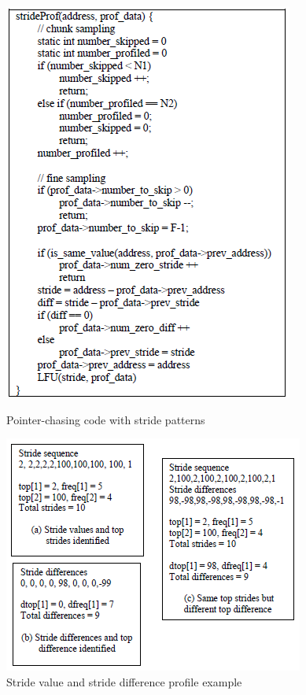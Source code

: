 \documentclass[11pt]{article}
\begin{document}
  \begin{figure}[h]
    \centering
    \begin{minipage} [b] {7.5cm}
      \includegraphics[scale=0.6]{./img/fig9}
      \caption{Pointer-chasing code with stride patterns\label{stride patterns}}
    \end{minipage}
    \begin{minipage} [b] {7.5cm}
      \includegraphics[scale=0.6]{./img/fig4}
      \caption{Stride value and stride difference profile example\label{fig4}}
    \end{minipage}
  \end{figure}
\end{document}
